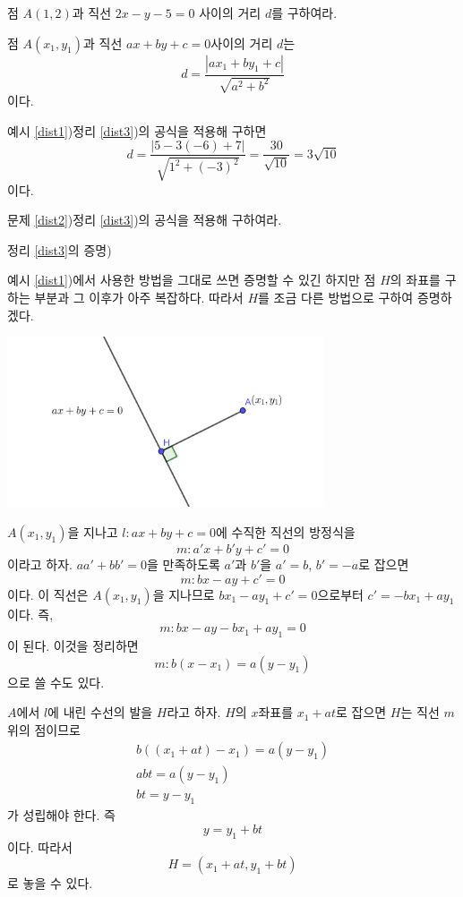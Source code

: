 \documentclass{oblivoir}
\begin{document}
\prob{}\label{dist2}
점 \(A(1,2)\)과 직선 \(2x-y-5=0\) 사이의 거리 \(d\)를 구하여라.

\begin{mdframed}
\theo{}\label{dist3}
점 \(A(x_1,y_1)\)과 직선 \(ax+by+c=0\)사이의 거리 \(d\)는
\[d=\frac{|ax_1+by_1+c|}{\sqrt{a^2+b^2}}\]
이다.
\end{mdframed}

\exam{}\label{dist4}
예시 \ref{dist1})\을 정리 \ref{dist3})의 공식을 적용해 구하면
\[d=\frac{|5-3(-6)+7|}{\sqrt{1^2+(-3)^2}}=\frac{30}{\sqrt{10}}=3\sqrt{10}\]
이다.

\prob{}\label{dist5}
문제 \ref{dist2})\를 정리 \ref{dist3})의 공식을 적용해 구하여라.

\clearpage
\bigskip\noindent\textsf{정리 \ref{dist3}의 증명)}\par
예시 \ref{dist1})에서 사용한 방법을 그대로 쓰면 증명할 수 있긴 하지만 점 \(H\)의 좌표를 구하는 부분과 그 이후가 아주 복잡하다.
따라서 \(H\)를 조금 다른 방법으로 구하여 증명하겠다.
\begin{center}
\includegraphics[width=0.7\textwidth]{distance_3}
\end{center}

\medskip
\(A(x_1,y_1)\)을 지나고 \(l:ax+by+c=0\)에 수직한 직선의 방정식을
\[m:a'x+b'y+c'=0\]
이라고 하자.
\(aa'+bb'=0\)을 만족하도록 \(a'\)과 \(b'\)을 \(a'=b\), \(b'=-a\)로 잡으면
\[m:bx-ay+c'=0\]
이다.
이 직선은 \(A(x_1,y_1)\)을 지나므로 \(bx_1-ay_1+c'=0\)으로부터 \(c'=-bx_1+ay_1\)이다.
즉,
\[m:bx-ay-bx_1+ay_1=0\]
이 된다.
이것을 정리하면
\[m:b(x-x_1)=a(y-y_1)\]
으로 쓸 수도 있다.

\medskip
\(A\)에서 \(l\)에 내린 수선의 발을 \(H\)라고 하자.
\(H\)의 \(x\)좌표를 \(x_1+at\)로 잡으면 \(H\)는 직선 \(m\) 위의 점이므로
\begin{gather*}
b\left((x_1+at)-x_1\right)=a(y-y_1)\\
abt=a(y-y_1)\\
bt=y-y_1
\end{gather*}
가 성립해야 한다. 즉
\[y=y_1+bt\]
이다.
따라서
\[H=(x_1+at,y_1+bt)\]
로 놓을 수 있다.
\end{document}
